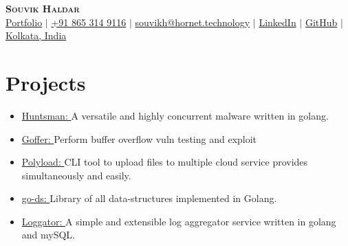 \documentclass[letterpaper,11pt]{article}
\newcommand{\resumeItem}[1]{
  \item\small{
    {#1 \vspace{-2pt}}
  }
}
\newcommand{\resumeSubHeadingListStart}{\begin{itemize}[leftmargin=0.15in, label={}]}
\newcommand{\resumeSubHeadingListEnd}{\end{itemize}}
\newcommand{\resumeItemListStart}{\begin{itemize}}
\newcommand{\resumeItemListEnd}{\end{itemize}\vspace{-5pt}}
\begin{document}

\begin{center}
    \textbf{\Huge \scshape Souvik Haldar} \\ \vspace{3pt}
    \small
    \faGlobe \hspace{.5pt} \href{http://www.souvikhaldar.in}{Portfolio}
    $|$
    \faMobile \hspace{.5pt} \href{tel:918653149116}{+91 865 314 9116}
    $|$
    \faAt \hspace{.5pt} \href{mailto:souvikh@hornet.technology}{souvikh@hornet.technology}
    $|$
    \faLinkedinSquare \hspace{.5pt} \href{https://www.linkedin.com/in/souvikhaldar/}{LinkedIn}
    $|$
    \faGithub \hspace{.5pt} \href{https://github.com/souvikhaldar}{GitHub}
    $|$
    \faMapMarker \hspace{.5pt} \href{https://www.google.com/maps/place/Kolkata,+West+Bengal/@22.5354122,88.277313,12z/data=!3m1!4b1!4m5!3m4!1s0x39f882db4908f667:0x43e330e68f6c2cbc!8m2!3d22.572646!4d88.363895}{Kolkata, India}
\end{center}



\section{Projects}
    \vspace{3pt}
    \resumeSubHeadingListStart
      \small{\item{
	\resumeItemListStart
       		\resumeItem{\href{github.com/souvikhaldar/huntsman}{\color{blue}Huntsman: }{A versatile and highly concurrent malware written in golang.} \\ \vspace{3pt}} 
       		\resumeItem{\href{github.com/souvikhaldar/goffer}{\color{blue}Goffer: }{Perform buffer overflow vuln testing and exploit} \\ \vspace{3pt}} 
       		\resumeItem{\href{github.com/souvikhaldar/polyload}{\color{blue}Polyload: }{CLI tool to upload files to multiple cloud service provides simultaneously and easily.} \\ \vspace{3pt}} 
       		\resumeItem{\href{github.com/souvikhaldar/go-ds}{\color{blue}go-ds: }{Library of all data-structures implemented in Golang.} \\ \vspace{3pt}} 
       		\resumeItem{\href{https://github.com/souvikhaldar/loggator}{\color{blue}Loggator: }{A simple and extensible log aggregator service written in golang and mySQL.} \\ \vspace{3pt}} 
	\resumeItemListEnd
    }}
    \resumeSubHeadingListEnd
\end{document}
